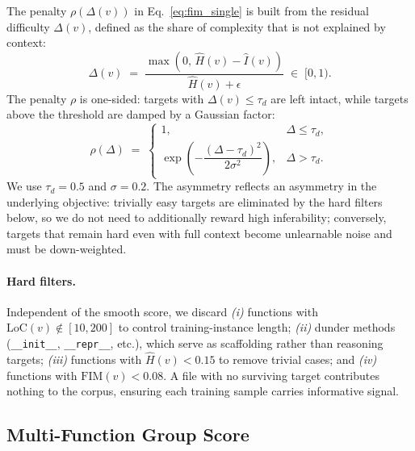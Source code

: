 The penalty $\rho(\Delta(v))$ in Eq.~\eqref{eq:fim_single} is built from
the residual difficulty $\Delta(v)$, defined as the share of complexity
that is not explained by context:
%
\begin{equation}
  \Delta(v) \;=\; \frac{\max\!\left(0,\,\hat{H}(v) - \hat{I}(v)\right)}{\hat{H}(v) + \epsilon}
  \;\in\; [0, 1).
  \label{eq:delta}
\end{equation}
%
The penalty $\rho$ is one-sided: targets with $\Delta(v) \le \tau_d$ are
left intact, while targets above the threshold are damped by a Gaussian
factor:
%
\begin{equation}
  \rho(\Delta) \;=\;
  \begin{cases}
    1, & \Delta \le \tau_d, \\[2pt]
    \exp\!\left(-\dfrac{(\Delta - \tau_d)^2}{2\sigma^2}\right), & \Delta > \tau_d.
  \end{cases}
  \label{eq:penalty}
\end{equation}
%
We use $\tau_d = 0.5$ and $\sigma = 0.2$. The asymmetry reflects an
asymmetry in the underlying objective: trivially easy targets are
eliminated by the hard filters below, so we do not need to additionally
reward high inferability; conversely, targets that remain hard even with
full context become unlearnable noise and must be down-weighted.

\paragraph{Hard filters.}
Independent of the smooth score, we discard \textit{(i)} functions with
$\mathrm{LoC}(v) \notin [10, 200]$ to control training-instance length;
\textit{(ii)} dunder methods (\texttt{\_\_init\_\_}, \texttt{\_\_repr\_\_},
etc.), which serve as scaffolding rather than reasoning targets;
\textit{(iii)} functions with $\hat{H}(v) < 0.15$ to remove trivial
cases; and \textit{(iv)} functions with $\mathrm{FIM}(v) < 0.08$. A file
with no surviving target contributes nothing to the corpus, ensuring each
training sample carries informative signal.

\subsection{Multi-Function Group Score}
\label{app:algo:groups}

